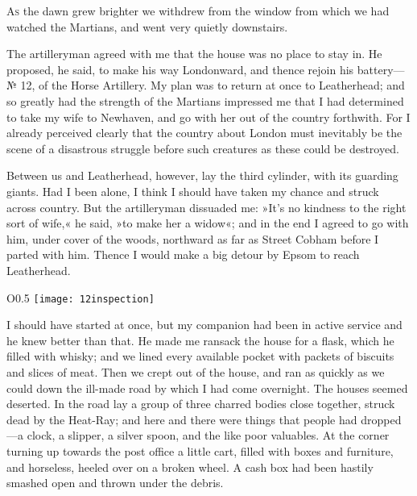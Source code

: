 


\lettrine[lines=4,findent=2pt]{A}{s} the dawn grew brighter we withdrew from the window from which we had watched the Martians, and went very quietly downstairs.

\zz
The artilleryman agreed with me that the house was no place to stay in. He proposed, he said, to make his way Londonward, and thence rejoin his battery—№ 12, of the Horse Artillery. My plan was to return at once to Leatherhead; and so greatly had the strength of the Martians impressed me that I had determined to take my wife to Newhaven, and go with her out of the country forthwith. For I already perceived clearly that the country about London must inevitably be the scene of a disastrous struggle before such creatures as these could be destroyed.

Between us and Leatherhead, however, lay the third cylinder, with its guarding giants. Had I been alone, I think I should have taken my chance and struck across country. But the artilleryman dissuaded me: »It's no kindness to the right sort of wife,« he said, »to make her a widow«; and in the end I agreed to go with him, under cover of the woods, northward as far as Street Cobham before I parted with him. Thence I would make a big detour by Epsom to reach Leatherhead.

\begin{letter}
	\begin{wrapfigure}{O}{0.5\textwidth}
		\centering
		\texttt{[image: 12inspection]}
	\end{wrapfigure}
\end{letter}

I should have started at once, but my companion had been in active service and he knew better than that. He made me ransack the house for a flask, which he filled with whisky; and we lined every available pocket with packets of biscuits and slices of meat. Then we crept out of the house, and ran as quickly as we could down the ill-made road by which I had come overnight. The houses seemed deserted. In the road lay a group of three charred bodies close together, struck dead by the Heat-Ray; and here and there were things that people had dropped—a clock, a slipper, a silver spoon, and the like poor valuables. At the corner turning up towards the post office a little cart, filled with boxes and furniture, and horseless, heeled over on a broken wheel. A cash box had been hastily smashed open and thrown under the debris.

